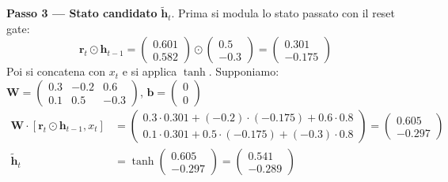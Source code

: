 \documentclass[12pt,a4paper]{article}
\begin{document}
\begin{examplebox}
\textbf{Passo 3 --- Stato candidato} $\tilde{\mathbf{h}}_t$. Prima si modula lo stato passato con il reset gate:
\[
    \mathbf{r}_t \odot \mathbf{h}_{t-1} = \begin{pmatrix} 0.601 \\ 0.582 \end{pmatrix} \odot \begin{pmatrix} 0.5 \\ -0.3 \end{pmatrix} = \begin{pmatrix} 0.301 \\ -0.175 \end{pmatrix}
\]
Poi si concatena con $x_t$ e si applica $\tanh$. Supponiamo:
$\mathbf{W} = \begin{pmatrix} 0.3 & -0.2 & 0.6 \\ 0.1 & 0.5 & -0.3 \end{pmatrix}$, $\mathbf{b} = \begin{pmatrix} 0 \\ 0 \end{pmatrix}$
\begin{align*}
    \mathbf{W} \cdot [\mathbf{r}_t \odot \mathbf{h}_{t-1}, x_t] &= \begin{pmatrix} 0.3 \cdot 0.301 + (-0.2) \cdot (-0.175) + 0.6 \cdot 0.8 \\ 0.1 \cdot 0.301 + 0.5 \cdot (-0.175) + (-0.3) \cdot 0.8 \end{pmatrix} = \begin{pmatrix} 0.605 \\ -0.297 \end{pmatrix} \\
    \tilde{\mathbf{h}}_t &= \tanh\!\begin{pmatrix} 0.605 \\ -0.297 \end{pmatrix} = \begin{pmatrix} 0.541 \\ -0.289 \end{pmatrix}
\end{align*}


\end{examplebox}
\end{document}
